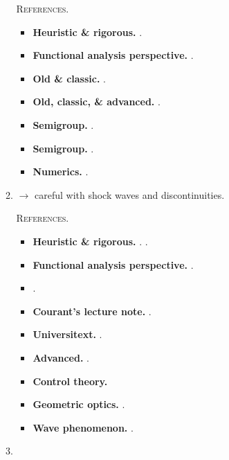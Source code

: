 \documentclass{book}
\numberwithin{equation}{section}
\begin{document}
\begin{enumerate}
\begin{enumerate}
        \textsc{References.}
        \begin{itemize}
            \item \textbf{Heuristic \& rigorous.} \cite[Sect. 7.1: 2nd-order parabolic equations]{Evans2010}.
            \item \textbf{Functional analysis perspective.} \cite[Chap. 10: Evolution Problems: The Heat Equation \& the Wave Equation]{Brezis2011}.
            \item \textbf{Old \& classic.} \cite{Friedman1964}.
            \item \textbf{Old, classic, \& advanced.} \cite{Ladyzhenskaja_Solonnikov_Uralceva1968}.
            \item \textbf{Semigroup.} \cite{Lunardi1995}.
            \item \textbf{Semigroup.} \cite{Ladyzhenskaya1991}.
            \item \textbf{Numerics.} \cite{Knabner_Angermann2003}.
        \end{itemize}
        \item {}
        
        $\to$ careful with shock waves and discontinuities.
        
        \textsc{References.}
        \begin{itemize}
            \item \textbf{Heuristic \& rigorous.} \cite[Sect. 7.2: 2nd-order hyperbolic equations]{Evans2010}. \cite[Sect. 7.3: Hyperbolic equations of 1st-order equations]{Evans2010}.
            \item \textbf{Functional analysis perspective.} \cite[Chap. 10: Evolution Problems: The Heat Equation \& the Wave Equation]{Brezis2011}.
            \item \cite{Taylor2011}.
            \item \textbf{Courant's lecture note.} \cite{Lax2006}.
            \item \textbf{Universitext.} \cite{Alinhac2009}.
            \item \textbf{Advanced.} \cite{Benzoni-Gavage_Serre2007}.
            \item \textbf{Control theory.} \cite{Lasiecka_Triggiani2000}
            \item \textbf{Geometric optics.} \cite{Rauch2012}.
            \item \textbf{Wave phenomenon.} \cite{Ikawa2000}.
        \end{itemize}
        \item {}
        

\end{enumerate}
\end{enumerate}
\end{document}

